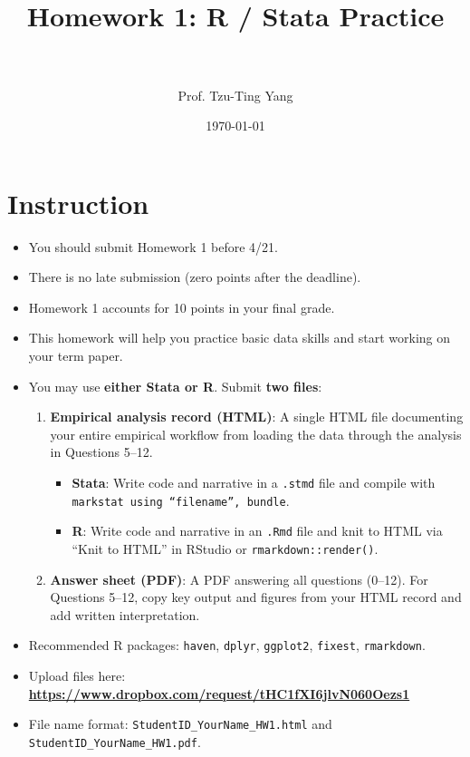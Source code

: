 \documentclass[paper=a4, fontsize=11pt]{scrartcl}
\title{
\normalfont \normalsize
\horrule{0.5pt} \\[0.4cm]
\huge Homework 1: R / Stata Practice \\
\horrule{2pt} \\[0.5cm]
}
\author{Prof. Tzu-Ting Yang}
\date{\normalsize\today}
\begin{document}
\maketitle


\section*{Instruction}

\begin{itemize}
\item[\textbullet] You should submit Homework 1 before 4/21.
\item[\textbullet] There is no late submission (zero points after the deadline).
\item[\textbullet] Homework 1 accounts for 10 points in your final grade.
\item[\textbullet] This homework will help you practice basic data skills and start working on your term paper.
\item[\textbullet] You may use \textbf{either Stata or R}. Submit \textbf{two files}:
  \begin{enumerate}
    \item \textbf{Empirical analysis record (HTML)}: A single HTML file documenting your entire empirical workflow from loading the data through the analysis in Questions 5--12.
    \begin{itemize}
      \item \textbf{Stata}: Write code and narrative in a \texttt{.stmd} file and compile with \texttt{markstat using ``filename'', bundle}.
      \item \textbf{R}: Write code and narrative in an \texttt{.Rmd} file and knit to HTML via ``Knit to HTML'' in RStudio or \texttt{rmarkdown::render()}.
    \end{itemize}
    \item \textbf{Answer sheet (PDF)}: A PDF answering all questions (0--12). For Questions 5--12, copy key output and figures from your HTML record and add written interpretation.
  \end{enumerate}
\item[\textbullet] Recommended R packages: \texttt{haven}, \texttt{dplyr}, \texttt{ggplot2}, \texttt{fixest}, \texttt{rmarkdown}.
\item[\textbullet] Upload files here: \textbf{\url{https://www.dropbox.com/request/tHC1fXI6jlvN060Oezs1}}
\item[\textbullet] File name format: \texttt{StudentID\_YourName\_HW1.html} and \texttt{StudentID\_YourName\_HW1.pdf}.
\end{itemize}
\end{document}
